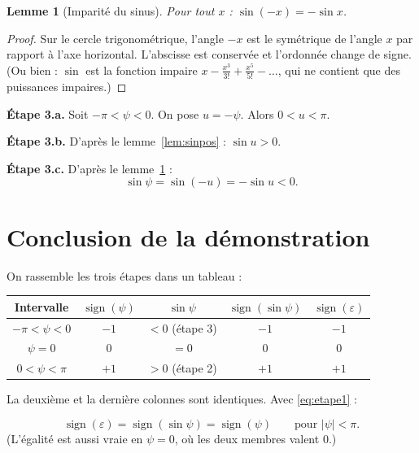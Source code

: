 \documentclass[11pt,a4paper]{article}
\numberwithin{equation}{section}
\theoremstyle{plain}
\newtheorem{lemme}[proposition]{Lemme}
\theoremstyle{definition}
\newcommand{\sign}{\operatorname{sign}}
\begin{document}
\begin{lemme}[Imparité du sinus]\label{lem:impair}
Pour tout $x$ : $\sin(-x) = -\sin x$.
\end{lemme}
\begin{proof}
Sur le cercle trigonométrique, l'angle $-x$ est le symétrique de l'angle $x$ par rapport à l'axe horizontal.
L'abscisse est conservée et l'ordonnée change de signe.
(Ou bien : $\sin$ est la fonction impaire $x - \frac{x^3}{3!} + \frac{x^5}{5!}-\dots$, qui ne contient que des puissances impaires.)
\end{proof}

\textbf{Étape 3.a.} Soit $-\pi<\psi<0$. On pose $u = -\psi$. Alors $0<u<\pi$.

\textbf{Étape 3.b.} D'après le lemme~\ref{lem:sinpos} : $\sin u>0$.

\textbf{Étape 3.c.} D'après le lemme~\ref{lem:impair} :
\begin{equation}
\sin\psi = \sin(-u) = -\sin u <0 .
\end{equation}

\section{Conclusion de la démonstration}

On rassemble les trois étapes dans un tableau :

\begin{center}
\renewcommand{\arraystretch}{1.4}
\begin{tabular}{|c|c|c|c|c|}
\hline
Intervalle & $\sign(\psi)$ & $\sin\psi$ & $\sign(\sin\psi)$ & $\sign(\varepsilon)$ \\
\hline
$-\pi<\psi<0$ & $-1$ & $<0$ (étape 3) & $-1$ & $-1$ \\
$\psi=0$ & $0$ & $=0$ & $0$ & $0$ \\
$0<\psi<\pi$ & $+1$ & $>0$ (étape 2) & $+1$ & $+1$ \\
\hline
\end{tabular}
\end{center}

La deuxième et la dernière colonnes sont identiques. Avec \eqref{eq:etape1} :

\begin{resultat}
\begin{equation}
\sign(\varepsilon) = \sign(\sin\psi) = \sign(\psi)\qquad\text{pour } |\psi|<\pi .
\end{equation}
(L'égalité est aussi vraie en $\psi=0$, où les deux membres valent $0$.)
\end{resultat}
\end{document}
